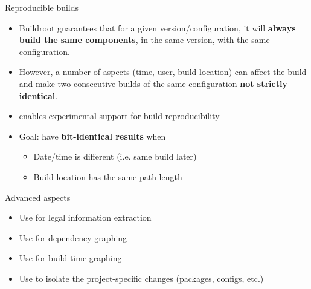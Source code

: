 \begin{frame}{Reproducible builds}
  \begin{itemize}
  \item Buildroot guarantees that for a given version/configuration,
    it will {\bf always build the same components}, in the same
    version, with the same configuration.
  \item However, a number of aspects (time, user, build location) can
    affect the build and make two consecutive builds of the same
    configuration {\bf not strictly identical}.
  \item {} enables experimental support for build
    reproducibility
  \item Goal: have {\bf bit-identical results} when
    \begin{itemize}
    \item Date/time is different (i.e. same build later)
    \item Build location has the same path length
    \end{itemize}
  \end{itemize}
\end{frame}

\setuplabframe
{Advanced aspects}
{
  \begin{itemize}
  \item Use  for legal information extraction
  \item Use  for dependency graphing
  \item Use  for build time graphing
  \item Use  to isolate the project-specific
    changes (packages, configs, etc.)
  \end{itemize}
}
